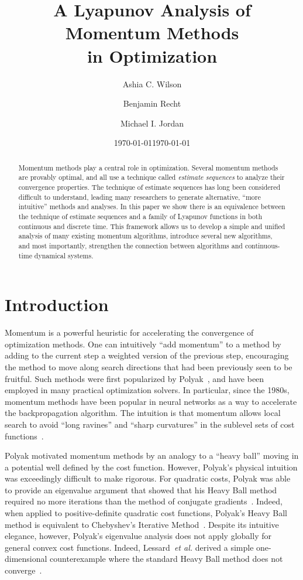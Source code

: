 \documentclass[11pt]{article}
\theoremstyle{plain}
\begin{document}
\title{A Lyapunov Analysis of Momentum Methods \\ in  Optimization}
\date{\today}
\author{Ashia C. Wilson \and Benjamin Recht \and Michael I. Jordan}
\date{\today}
\maketitle
\begin{abstract}
Momentum methods play a central role in optimization. Several momentum methods are provably optimal, and all use a technique called {\em estimate sequences} to analyze their convergence properties.  The technique of estimate sequences has long been considered difficult to understand, leading many researchers to generate alternative, ``more intuitive'' methods and analyses. In this paper we show there is an equivalence between the technique of estimate sequences and a family of Lyapunov functions in both continuous and discrete time. This framework allows us to develop a simple and unified analysis of many existing momentum algorithms, introduce several new algorithms, and most importantly, strengthen the connection between algorithms and continuous-time dynamical systems. 
\end{abstract}

\section{Introduction}

Momentum is a powerful heuristic for accelerating the convergence of optimization methods.    One can intuitively ``add momentum'' to a method by adding to the current step a weighted version of the previous step, encouraging the method to move along search directions that had been previously seen to be fruitful.  Such methods were first popularized by Polyak~\cite{Polyak1964}, and have been employed in many practical optimization solvers.  In particular, since the 1980s, momentum methods have been popular in neural networks as a way to accelerate the backpropagation algorithm.  The intuition is that momentum allows local search to avoid ``long ravines'' and ``sharp curvatures'' in the sublevel sets of cost functions~\cite{Rumelhardt}.

Polyak motivated momentum methods by an analogy to a ``heavy ball'' moving in a potential well defined by the cost function.  However, Polyak's physical intuition was exceedingly difficult to make rigorous.  For quadratic costs, Polyak was able to provide an eigenvalue argument that showed that his Heavy Ball method required no more iterations than the method of conjugate gradients~\cite{Polyak1964}.  
Indeed, when applied to positive-definite quadratic cost functions, Polyak's Heavy Ball method is equivalent to Chebyshev's Iterative Method~\cite{Chebyshev}.   Despite its intuitive elegance, however, Polyak's eigenvalue analysis does not apply globally for general convex cost functions. Indeed, Lessard~\emph{et al.} derived a simple one-dimensional counterexample where the standard Heavy Ball method does not converge~\cite{Lessard14}.  
\end{document}
